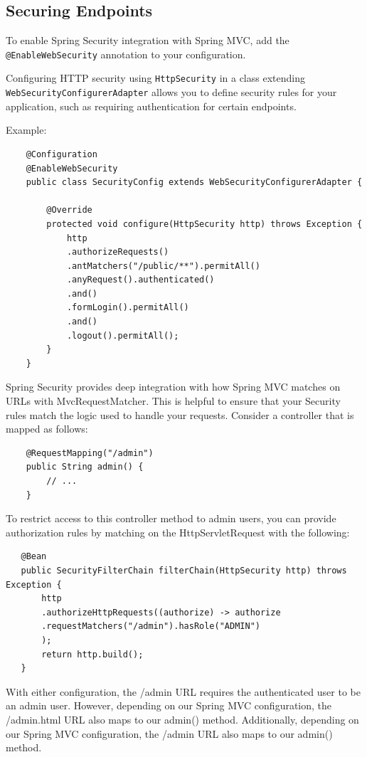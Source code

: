 \documentclass{scrartcl}
\begin{document}
\subsection{Securing Endpoints}

To enable Spring Security integration with Spring MVC, add the \lstinline|@EnableWebSecurity| annotation to your configuration.

Configuring HTTP security using \lstinline|HttpSecurity| in a class extending \lstinline|WebSecurityConfigurerAdapter| allows you to define security rules for your application, such as requiring authentication for certain endpoints.

Example:

\begin{lstlisting}
    @Configuration
    @EnableWebSecurity
    public class SecurityConfig extends WebSecurityConfigurerAdapter {

        @Override
        protected void configure(HttpSecurity http) throws Exception {
            http
            .authorizeRequests()
            .antMatchers("/public/**").permitAll()
            .anyRequest().authenticated()
            .and()
            .formLogin().permitAll()
            .and()
            .logout().permitAll();
        }
    }
\end{lstlisting}

Spring Security provides deep integration with how Spring MVC matches on URLs with MvcRequestMatcher. This is helpful to ensure that your Security rules match the logic used to handle your requests.
Consider a controller that is mapped as follows:

\begin{lstlisting}
    @RequestMapping("/admin")
    public String admin() {
        // ...
    }
\end{lstlisting}

To restrict access to this controller method to admin users, you can provide authorization rules by matching on the HttpServletRequest with the following:

\begin{lstlisting}
   @Bean
   public SecurityFilterChain filterChain(HttpSecurity http) throws Exception {
       http
       .authorizeHttpRequests((authorize) -> authorize
       .requestMatchers("/admin").hasRole("ADMIN")
       );
       return http.build();
   }

\end{lstlisting}

With either configuration, the /admin URL requires the authenticated user to be an admin user. However, depending on our Spring MVC configuration, the /admin.html URL also maps to our admin() method. Additionally, depending on our Spring MVC configuration, the /admin URL also maps to our admin() method.
\end{document}
